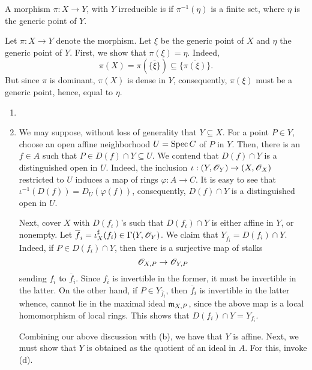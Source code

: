 \begin{definition}
    A morphism $\pi: X\to Y$, with $Y$ irreducible is  if $\pi^{-1}(\eta)$ is a finite set, where $\eta$ is the generic point of $Y$.
\end{definition}

\setcounter{exercise}{6}
\begin{exercise} %
    Let $\pi: X\to Y$ denote the morphism. Let $\xi$ be the generic point of $X$ and $\eta$ the generic point of $Y$. First, we show that $\pi(\xi) = \eta$. Indeed, 
    \begin{equation*}
        \pi(X) = \pi(\overline{\{\xi\}})\subseteq\overline{\{\pi(\xi)\}}.
    \end{equation*}
    But since $\pi$ is dominant, $\pi(X)$ is dense in $Y$, consequently, $\pi(\xi)$ must be a generic point, hence, equal to $\eta$.
\end{exercise}

\setcounter{exercise}{10}
\begin{exercise}\hfill %
\begin{enumerate}[label=(\alph*)]
    \item 
    \item We may suppose, without loss of generality that $Y\subseteq X$. For a point $P\in Y$, choose an open affine neighborhood $U = \operatorname{Spec} C$ of $P$ in $Y$. Then, there is an $f\in A$ such that $P\in D(f)\cap Y\subseteq U$. We contend that $D(f)\cap Y$ is a distinguished open in $U$.
    Indeed, the inclusion $\iota: (Y,\mathscr{O}_Y)\to(X,\mathscr{O}_X)$ restricted to $U$ induces a map of rings $\varphi: A\to C$. It is easy to see that $\iota^{-1}(D(f)) = D_U(\varphi(f))$, consequently, $D(f)\cap Y$ is a distinguished open in $U$.

    Next, cover $X$ with $D(f_i)$'s such that $D(f_i)\cap Y$ is either affine in $Y$, or nonempty. Let $\overline f_i = \iota^\sharp_X(f_i)\in\Gamma(Y,\mathscr{O}_Y)$. We claim that $Y_{\overline f_i} = D(f_i)\cap Y$. Indeed, if $P\in D(f_i)\cap Y$, then there is a surjective map of stalks 
    \begin{equation*}
        \mathscr{O}_{X,P}\to\mathscr{O}_{Y, P}
    \end{equation*}
    sending $f_i$ to $\overline f_i$. Since $f_i$ is invertible in the former, it must be invertible in the latter. On the other hand, if $P\in Y_{\overline f_i}$, then $\overline f_i$ is invertible in the latter whence, cannot lie in the maximal ideal $\mathfrak{m}_{X, P}$, since the above map is a local homomorphism of local rings. This shows that $D(f_i)\cap Y = Y_{f_i}$. 

    Combining our above discussion with  (b), we have that $Y$ is affine. Next, we must show that $Y$ is obtained as the quotient of an ideal in $A$. For this, invoke  (d).
\end{enumerate}
\end{exercise}

